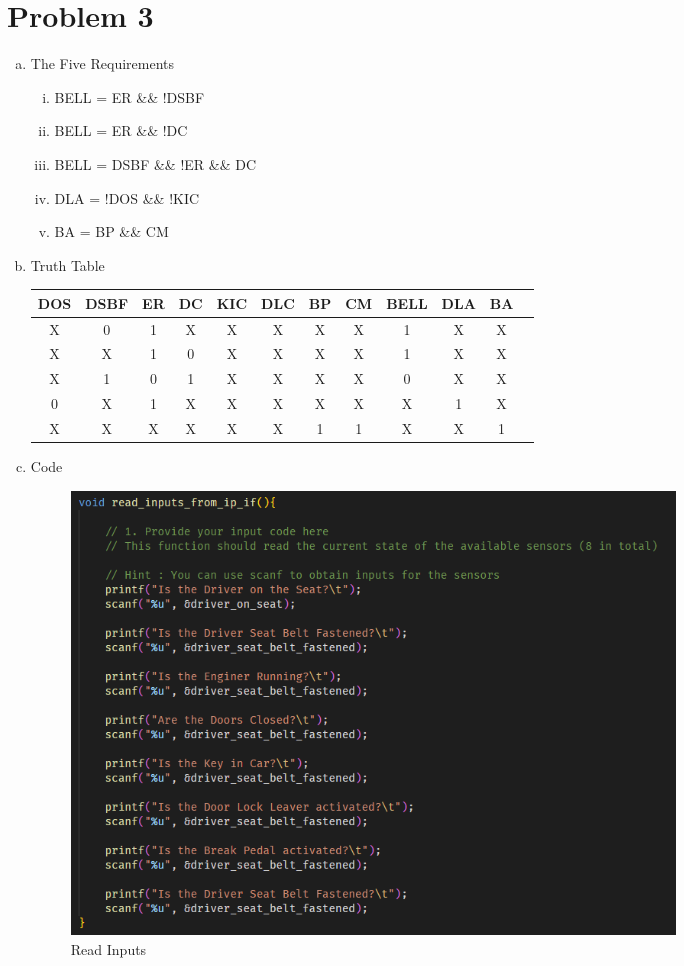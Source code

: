 \clearpage
\section*{Problem 3}
\begin{enumerate}[a)]
    \item The Five Requirements
    \begin{enumerate}[i.]
        \item BELL = ER \&\& !DSBF
        \item BELL = ER \&\& !DC
        \item BELL = DSBF \&\& !ER \&\& DC
        \item DLA = !DOS \&\& !KIC
        \item BA = BP \&\& CM
    \end{enumerate}
    \item Truth Table\\
    \begin{tabular}{|c|c|c|c|c|c|c|c|c|c|c|c}
        \hline
        DOS & DSBF & ER & DC & KIC & DLC & BP & CM & BELL & DLA & BA \\
        \hline
        X & 0 & 1 & X & X & X & X & X & 1 & X & X\\
        \hline
        X & X & 1 & 0 & X & X & X & X & 1 & X & X\\
        \hline
        X & 1 & 0 & 1 & X & X & X & X & 0 & X & X\\
        \hline
        0 & X & 1 & X & X & X & X & X & X & 1 & X\\
        \hline
        X & X & X & X & X & X & 1 & 1 & X & X & 1\\
        \hline
    \end{tabular}
    \item Code
    
    \begin{figure}[h!]
        \centering
        \includegraphics[width=0.8\textwidth]{Images/3a Code Read.png}
        \caption{Read Inputs}
    \end{figure}
    

\end{enumerate}
